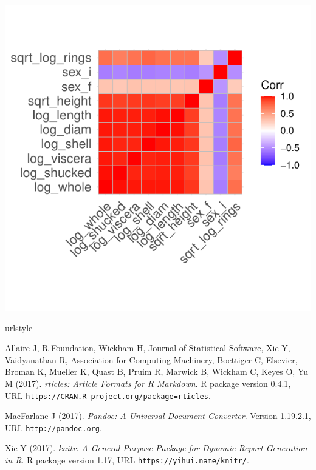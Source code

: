 \documentclass[letterpaper,9pt,twocolumn,twoside,]{pinp}
\begin{document}
\begin{center}\includegraphics{ExecSum_files/figure-latex/unnamed-chunk-11-1} \end{center}


\pnasbreak 



\begin{thebibliography}{3}
\newcommand{\enquote}[1]{``#1''}
\providecommand{\natexlab}[1]{#1}
\providecommand{\url}[1]{\texttt{#1}}
\providecommand{\urlprefix}{URL }
\expandafter\ifx\csname urlstyle\endcsname\relax
  \providecommand{\doi}[1]{doi:\discretionary{}{}{}#1}\else
  \providecommand{\doi}{doi:\discretionary{}{}{}\begingroup
  \urlstyle{rm}\Url}\fi
\providecommand{\eprint}[2][]{\url{#2}}

Allaire J, {R Foundation}, Wickham H, {Journal of Statistical Software}, Xie Y,
  Vaidyanathan R, {Association for Computing Machinery}, Boettiger C,
  {Elsevier}, Broman K, Mueller K, Quast B, Pruim R, Marwick B, Wickham C,
  Keyes O, Yu M (2017).
\newblock \emph{rticles: Article Formats for R Markdown}.
\newblock R package version 0.4.1,
  \urlprefix\url{https://CRAN.R-project.org/package=rticles}.

MacFarlane J (2017).
\newblock \emph{Pandoc: A Universal Document Converter}.
\newblock Version 1.19.2.1, \urlprefix\url{http://pandoc.org}.

Xie Y (2017).
\newblock \emph{knitr: A General-Purpose Package for Dynamic Report Generation
  in R}.
\newblock R package version 1.17, \urlprefix\url{https://yihui.name/knitr/}.

\end{thebibliography}
\end{document}
